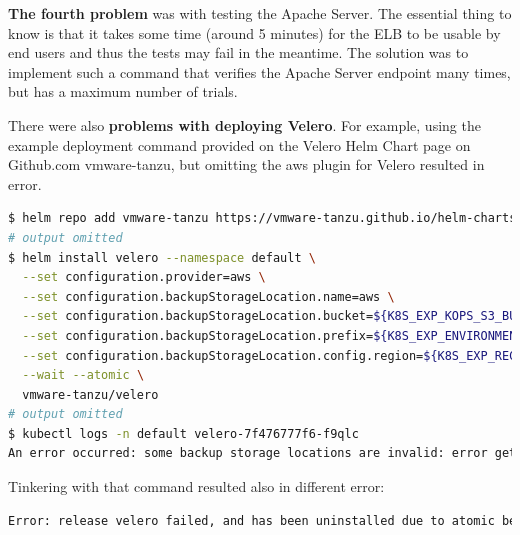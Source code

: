 \textbf{The fourth problem} was with testing the Apache Server. The essential thing to know is that it takes some time (around 5 minutes) for the ELB to be usable by end users and thus the tests may fail in the meantime. The solution was to implement such a command that verifies the Apache Server endpoint many times, but has a maximum number of trials.

There were also \textbf{problems with deploying Velero}. For example, using the example deployment command provided on the Velero Helm Chart page on Github.com vmware-tanzu\cite{velero-helm-chart}, but omitting the aws plugin for Velero resulted in error.

\begin{lstlisting}[basicstyle=\tiny,caption={Installing Velero server},captionpos=b,language=Bash,xleftmargin=1cm]
$ helm repo add vmware-tanzu https://vmware-tanzu.github.io/helm-charts
# output omitted
$ helm install velero --namespace default \
  --set configuration.provider=aws \
  --set configuration.backupStorageLocation.name=aws \
  --set configuration.backupStorageLocation.bucket=${K8S_EXP_KOPS_S3_BUCKET} \
  --set configuration.backupStorageLocation.prefix=${K8S_EXP_ENVIRONMENT} \
  --set configuration.backupStorageLocation.config.region=${K8S_EXP_REGION} \
  --wait --atomic \
  vmware-tanzu/velero
# output omitted
$ kubectl logs -n default velero-7f476777f6-f9qlc
An error occurred: some backup storage locations are invalid: error getting backup store for location "aws": unable to locate ObjectStore plugin named velero.io/aws
\end{lstlisting}

Tinkering with that command resulted also in different error:
\begin{lstlisting}[basicstyle=\tiny,caption={Velero server installation error},captionpos=b,language=Bash,xleftmargin=1cm]
Error: release velero failed, and has been uninstalled due to atomic being set: timed out waiting for the condition
\end{lstlisting}

